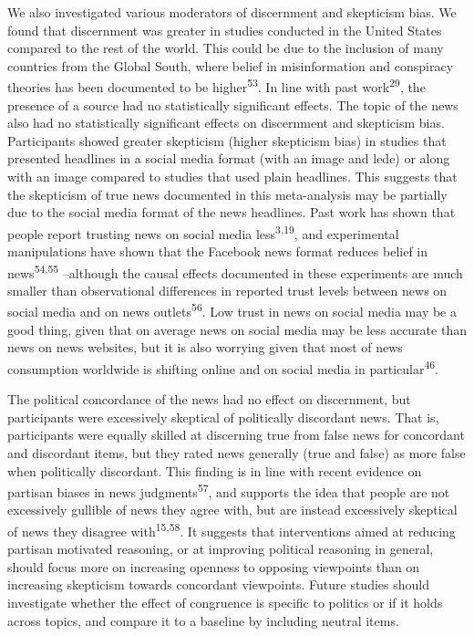 \documentclass[
  man]{apa6}
\begin{document}
We also investigated various moderators of discernment and skepticism bias. We found that discernment was greater in studies conducted in the United States compared to the rest of the world. This could be due to the inclusion of many countries from the Global South, where belief in misinformation and conspiracy theories has been documented to be higher\textsuperscript{53}. In line with past work\textsuperscript{29}, the presence of a source had no statistically significant effects. The topic of the news also had no statistically significant effects on discernment and skepticism bias. Participants showed greater skepticism (higher skepticism bias) in studies that presented headlines in a social media format (with an image and lede) or along with an image compared to studies that used plain headlines. This suggests that the skepticism of true news documented in this meta-analysis may be partially due to the social media format of the news headlines. Past work has shown that people report trusting news on social media less\textsuperscript{3,19}, and experimental manipulations have shown that the Facebook news format reduces belief in news\textsuperscript{54,55} --although the causal effects documented in these experiments are much smaller than observational differences in reported trust levels between news on social media and on news outlets\textsuperscript{56}. Low trust in news on social media may be a good thing, given that on average news on social media may be less accurate than news on news websites, but it is also worrying given that most of news consumption worldwide is shifting online and on social media in particular\textsuperscript{46}.

The political concordance of the news had no effect on discernment, but participants were excessively skeptical of politically discordant news. That is, participants were equally skilled at discerning true from false news for concordant and discordant items, but they rated news generally (true and false) as more false when politically discordant. This finding is in line with recent evidence on partisan biases in news judgments\textsuperscript{57}, and supports the idea that people are not excessively gullible of news they agree with, but are instead excessively skeptical of news they disagree with\textsuperscript{15,58}. It suggests that interventions aimed at reducing partisan motivated reasoning, or at improving political reasoning in general, should focus more on increasing openness to opposing viewpoints than on increasing skepticism towards concordant viewpoints. Future studies should investigate whether the effect of congruence is specific to politics or if it holds across topics, and compare it to a baseline by including neutral items.
\end{document}
